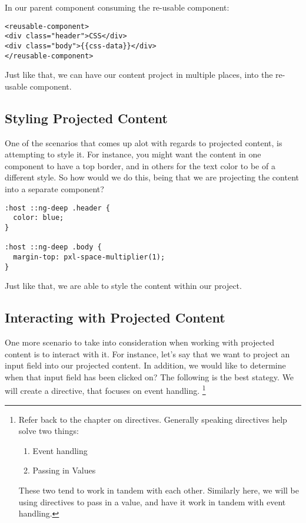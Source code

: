 In our parent component consuming the re-usable component:
\begin{lstlisting}
<reusable-component>
<div class="header">CSS</div>
<div class="body">{{css-data}}</div>
</reusable-component>
\end{lstlisting}

Just like that, we can have our content project in multiple places, into the
re-usable component.

\subsection{Styling Projected Content}
One of the scenarios that comes up alot with regards to projected content, is
attempting to style it. For instance, you might want the content in one
component to have a top border, and in others for the text color to be of a
different style. So how would we do this, being that we are projecting the
content into a separate component?
\begin{verbatim}
:host ::ng-deep .header {
  color: blue;
}

:host ::ng-deep .body {
  margin-top: pxl-space-multiplier(1);
}
\end{verbatim}

Just like that, we are able to style the content within our project.

\subsection{ Interacting with Projected Content }
One more scenario to take into consideration when working with projected content
is to interact with it. For instance, let's say that we want to project an
input field into our projected content. In addition, we would like to determine
when that input field has been clicked on? The following is the best stategy.
We will create a directive, that focuses on event handling.
\footnote{Refer back to the chapter on directives. Generally speaking directives
help solve two things:
\begin{enumerate}
  \item Event handling
  \item Passing in Values
\end{enumerate}
These two tend to work in tandem with each other. Similarly here, we will be
using directives to pass in a value, and have it work in tandem with event
handling.
}

